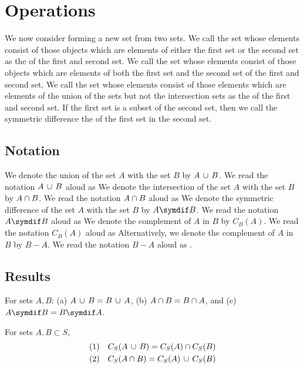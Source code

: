 \section{Operations}

We now consider forming a new set from two sets.
We call the set whose elements consist of those objects which are elements of either the first set or the second set as the  of the first and second set.
We call the set whose elements consist of those objects which are elements of both the first set and the second set  of the first and second set.
We call the set whose elements consist of those elements which are elements of the union of the sets but not the intersection sets as the  of the first and second set.
If the first set is a subset of the second set, then we call the symmetric difference the  of the first set in the second set.

\subsection{Notation}

We denote the union of the set $A$ with the set $B$ by $A \,\cup\, B$.
We read the notation $A \,\cup\, B$ aloud as 
We denote the intersection of the set $A$ with the set $B$ by $A \cap B$.
We read the notation $A \cap B$ aloud as 
We denote the symmetric difference of the set $A$ with the set $B$ by $A \symdif B$.
We read the notation $A \symdif B$ aloud as 
We denote the complement of $A$ in $B$ by $C_B(A)$.
We read the notation $C_B(A)$ aloud as 
Alternatively, we denote the complement of $A$ in $B$ by $B - A$.
We read the notation $B - A$ aloud as .

\subsection{Results}

\begin{prop}
  For sets $A, B$: (a) $A \,\cup\, B = B \,\cup\, A$, (b) $A \cap B = B \cap A$, and (c)  $A \symdif B = B \symdif A$.
\end{prop}

\begin{prop}
  For sets $A, B \subset S$,
  \[
    \begin{aligned}
      \text{(1)} \quad & C_S(A \,\cup\, B) = C_S(A) \cap C_S(B) \\
      \text{(2)} \quad & C_S(A \cap B) = C_S(A) \,\cup\, C_S(B)
    \end{aligned}
  \]
\end{prop}

